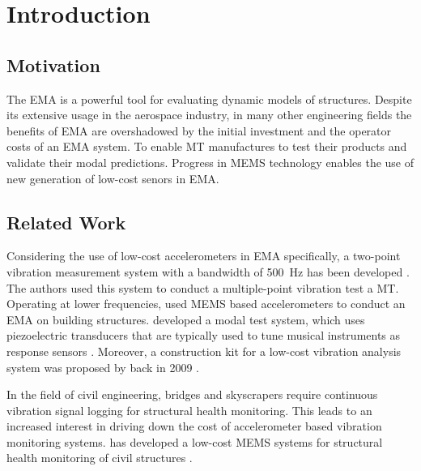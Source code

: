\setcounter{chapter}{0}

\chapter{Introduction}

\section{Motivation}
The \ac{EMA} is a powerful tool for evaluating dynamic models of structures. Despite its extensive usage in the aerospace industry, in many other engineering fields the benefits of \ac{EMA} are overshadowed by the initial investment and the operator costs of an \ac{EMA} system. To enable \ac{MT} manufactures to test their products and validate their modal predictions. Progress in \ac{MEMS} technology enables the use of new generation of low-cost senors in \ac{EMA}.

\section{Related Work}

Considering the use of low-cost accelerometers in \ac{EMA} specifically, a two-point vibration measurement system with a bandwidth of \SI{500}{\hertz} has been developed \cite{chan2017multiple}. The authors \citeauthor{chan2017multiple} used this system to conduct a multiple-point vibration test a \ac{MT}. Operating at lower frequencies, \citeauthor{beskhyroun2012low} used \ac{MEMS} based accelerometers to conduct an \ac{EMA} on building structures. \citeauthor{piana2016experimental} developed a modal test system, which uses piezoelectric transducers that are typically used to tune musical instruments as response sensors \cite{piana2016experimental}. Moreover, a construction kit for a low-cost vibration analysis system was proposed by \citeauthor{vollmer2009construction} back in 2009 \cite{vollmer2009construction}.

In the field of civil engineering, bridges and skyscrapers require continuous vibration signal logging for structural health monitoring. This leads to an increased interest in driving down the cost of accelerometer based vibration monitoring systems. \citeauthor{girolami2018modal} has developed a low-cost \ac{MEMS} systems for structural health monitoring of civil structures \cite{girolami2018modal}.

